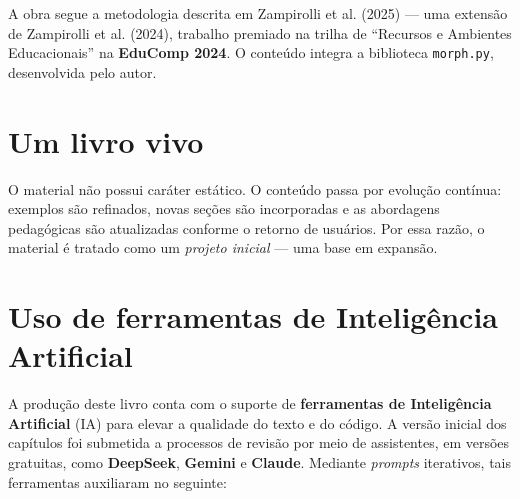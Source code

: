 \documentclass[
  portuguese,
  letterpaper,
  openany,
  oneside,
  12pt,
  a4paper]{book}
\begin{document}
\begin{tcolorbox}[enhanced jigsaw, coltitle=black, colback=white, colbacktitle=quarto-callout-important-color!10!white, bottomtitle=1mm, left=2mm, opacityback=0, breakable, rightrule=.15mm, titlerule=0mm, toptitle=1mm, opacitybacktitle=0.6, title=\textcolor{quarto-callout-important-color}{\faExclamation}\hspace{0.5em}{Destaque}, colframe=quarto-callout-important-color-frame, arc=.35mm, bottomrule=.15mm, toprule=.15mm, leftrule=.75mm]

A obra segue a metodologia descrita em Zampirolli et al. (2025) --- uma
extensão de Zampirolli et al. (2024), trabalho premiado na trilha de
``Recursos e Ambientes Educacionais'' na \textbf{EduComp 2024}. O
conteúdo integra a biblioteca \texttt{morph.py}, desenvolvida pelo
autor.

\end{tcolorbox}

\section*{Um livro vivo}\label{um-livro-vivo}


O material não possui caráter estático. O conteúdo passa por evolução
contínua: exemplos são refinados, novas seções são incorporadas e as
abordagens pedagógicas são atualizadas conforme o retorno de usuários.
Por essa razão, o material é tratado como um \emph{projeto inicial} ---
uma base em expansão.

\section*{Uso de ferramentas de Inteligência
Artificial}\label{uso-de-ferramentas-de-inteliguxeancia-artificial}


A produção deste livro conta com o suporte de \textbf{ferramentas de
Inteligência Artificial} (IA) para elevar a qualidade do texto e do
código. A versão inicial dos capítulos foi submetida a processos de
revisão por meio de assistentes, em versões gratuitas, como
\textbf{DeepSeek}, \textbf{Gemini} e \textbf{Claude}. Mediante
\emph{prompts} iterativos, tais ferramentas auxiliaram no seguinte:
\end{document}
